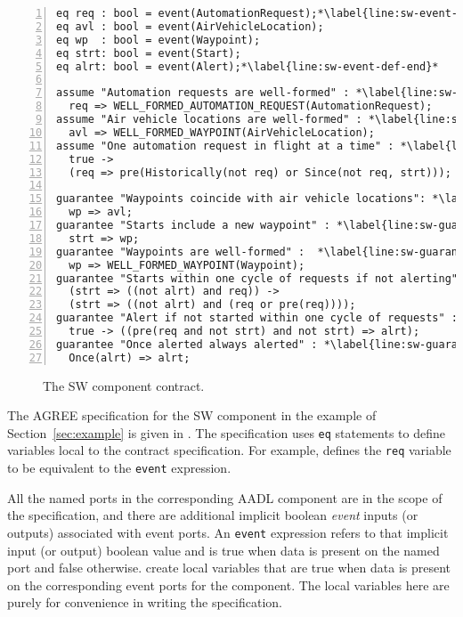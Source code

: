 \newsavebox{\sw}
\begin{lrbox}{\sw}
\begin{lstlisting}[style=agree,numbers=left]
eq req : bool = event(AutomationRequest);*\label{line:sw-event-def-start}*
eq avl : bool = event(AirVehicleLocation);
eq wp  : bool = event(Waypoint);
eq strt: bool = event(Start);
eq alrt: bool = event(Alert);*\label{line:sw-event-def-end}*

assume "Automation requests are well-formed" : *\label{line:sw-assume-1}*
  req => WELL_FORMED_AUTOMATION_REQUEST(AutomationRequest);
assume "Air vehicle locations are well-formed" : *\label{line:sw-assume-2}*
  avl => WELL_FORMED_WAYPOINT(AirVehicleLocation);
assume "One automation request in flight at a time" : *\label{line:sw-assume-3}*
  true ->
  (req => pre(Historically(not req) or Since(not req, strt)));

guarantee "Waypoints coincide with air vehicle locations": *\label{line:sw-guarantee-1}*
  wp => avl;
guarantee "Starts include a new waypoint" : *\label{line:sw-guarantee-2}*
  strt => wp;
guarantee "Waypoints are well-formed" :  *\label{line:sw-guarantee-3}*
  wp => WELL_FORMED_WAYPOINT(Waypoint);
guarantee "Starts within one cycle of requests if not alerting" : *\label{line:sw-guarantee-4}*
  (strt => ((not alrt) and req)) ->
  (strt => ((not alrt) and (req or pre(req))));
guarantee "Alert if not started within one cycle of requests" : *\label{line:sw-guarantee-5}*
  true -> ((pre(req and not strt) and not strt) => alrt);
guarantee "Once alerted always alerted" : *\label{line:sw-guarantee-6}*
  Once(alrt) => alrt;
\end{lstlisting}
\end{lrbox}

\begin{figure}
  \begin{center}
    \scalebox{0.62}{\usebox{\sw}}
  \end{center}
  \caption{The SW component contract.}
  \label{fig:sw}
\end{figure}

The AGREE specification for the SW component in the example of
Section~\ref{sec:example} is given in .  The
specification uses \texttt{eq} statements to define variables local to
the contract specification.  For
example,  defines the \texttt{req}
variable to be equivalent to the \texttt{event} expression.

All the named ports in the corresponding AADL component are in the scope of the specification, and there are additional implicit boolean \emph{event} inputs (or outputs) associated with event ports.
An \texttt{event} expression refers to that implicit input (or output) boolean value and is true when data is present on the named port and false otherwise.
 create local variables that are true when data is present on the corresponding event ports for the component.
The local variables here are purely for convenience in writing the specification.

